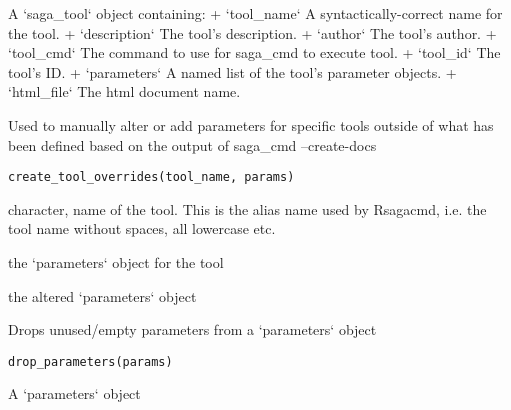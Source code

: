 \documentclass[a4paper]{book}
\begin{document}
%
\begin{Value}
A `saga\_tool` object containing:
+ `tool\_name` A syntactically-correct name for the tool.
+ `description` The tool's description.
+ `author` The tool's author.
+ `tool\_cmd` The command to use for saga\_cmd to execute tool.
+ `tool\_id` The tool's ID.
+ `parameters` A named list of the tool's parameter objects.
+ `html\_file` The html document name.
\end{Value}
%
\begin{Description}
Used to manually alter or add parameters for specific tools outside of what
has been defined based on the output of saga\_cmd --create-docs
\end{Description}
%
\begin{Usage}
\begin{verbatim}
create_tool_overrides(tool_name, params)
\end{verbatim}
\end{Usage}
%
\begin{Arguments}
\begin{ldescription}
\item[\code{tool\_name}] character, name of the tool. This is the alias name used by
Rsagacmd, i.e. the tool name without spaces, all lowercase etc.

\item[\code{params}] the `parameters` object for the tool
\end{ldescription}
\end{Arguments}
%
\begin{Value}
the altered `parameters` object
\end{Value}
%
\begin{Description}
Drops unused/empty parameters from a `parameters` object
\end{Description}
%
\begin{Usage}
\begin{verbatim}
drop_parameters(params)
\end{verbatim}
\end{Usage}
%
\begin{Arguments}
\begin{ldescription}
\item[\code{params}] A `parameters` object
\end{ldescription}
\end{Arguments}
\end{document}
